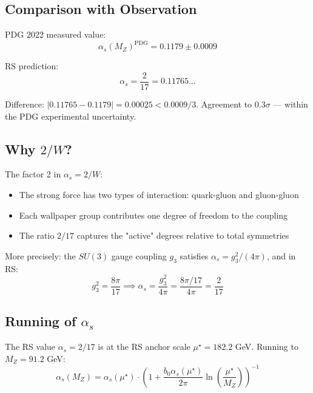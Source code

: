 \documentclass[12pt,a4paper]{article}
\theoremstyle{definition}
\theoremstyle{remark}
\begin{document}
\subsection{Comparison with Observation}

PDG 2022 measured value:
\begin{equation}
\alpha_s(M_Z)^\mathrm{PDG} = 0.1179 \pm 0.0009
\end{equation}

RS prediction:
\begin{equation}
\alpha_s = \frac{2}{17} = 0.11765...
\end{equation}

Difference: $|0.11765 - 0.1179| = 0.00025 < 0.0009/3$.
Agreement to $0.3\sigma$ --- within the PDG experimental uncertainty.

\subsection{Why $2/W$?}

The factor 2 in $\alpha_s = 2/W$:
\begin{itemize}
\item The strong force has two types of interaction: quark-gluon and gluon-gluon
\item Each wallpaper group contributes one degree of freedom to the coupling
\item The ratio $2/17$ captures the "active" degrees relative to total symmetries
\end{itemize}

More precisely: the $SU(3)$ gauge coupling $g_3$ satisfies 
$\alpha_s = g_3^2/(4\pi)$, and in RS:
\begin{equation}
g_3^2 = \frac{8\pi}{17} \implies \alpha_s = \frac{g_3^2}{4\pi} = \frac{8\pi/17}{4\pi} = \frac{2}{17}
\end{equation}

\subsection{Running of $\alpha_s$}

The RS value $\alpha_s = 2/17$ is at the RS anchor scale $\mu^\star = 182.2$ GeV.
Running to $M_Z = 91.2$ GeV:
\begin{equation}
\alpha_s(M_Z) = \alpha_s(\mu^\star) \cdot \left(1 + \frac{b_0 \alpha_s(\mu^\star)}{2\pi} \ln\!\left(\frac{\mu^\star}{M_Z}\right)\right)^{-1}
\end{equation}
\end{document}
